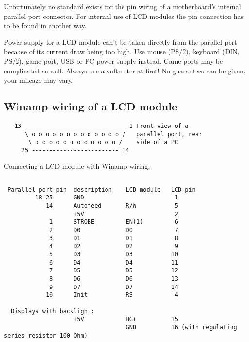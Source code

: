   Unfortunately no standard exists for the pin wiring of a motherboard's internal parallel 
  port connector. For internal use of LCD modules the pin connection has to be found in 
  another way.

  Power supply for a LCD module can't be taken directly from the parallel port because 
  of its current draw being too high. Use mouse (PS/2), keyboard (DIN, PS/2), game port, 
  USB or PC power supply instead. Game ports may be complicated as well. Always use a 
  voltmeter at first! No guarantees can be given, your mileage may vary.
  
\subsection{Winamp-wiring of a LCD module}
 
\begin{example}
\begin{verbatim}
   13 _____________________________ 1 Front view of a 
      \ o o o o o o o o o o o o o /   parallel port, rear
       \ o o o o o o o o o o o o /    side of a PC
     25 ------------------------- 14
\end{verbatim}
\end{example}
   

 Connecting a LCD module with Winamp wiring:

 
\begin{example}
\begin{verbatim}
 
 Parallel port pin  description    LCD module   LCD pin
         18-25      GND                          1
            14      Autofeed       R/W           5
                    +5V                          2
             1      STROBE         EN(1)         6
             2      D0             D0            7
             3      D1             D1            8
             4      D2             D2            9
             5      D3             D3           10
             6      D4             D4           11
             7      D5             D5           12
             8      D6             D6           13
             9      D7             D7           14
            16      Init           RS            4

  Displays with backlight:
                    +5V            HG+          15
                                   GND          16 (with regulating series resistor 100 Ohm)
\end{verbatim}
\end{example}

